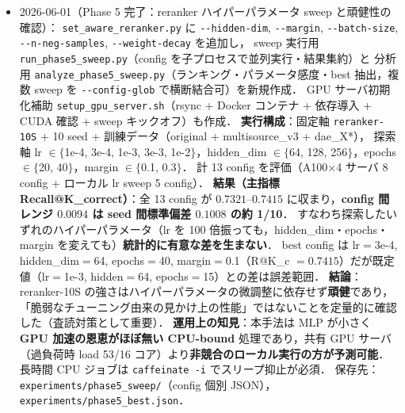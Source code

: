 \documentclass[11pt,a4paper]{jsarticle}
\begin{document}
\begin{itemize}[nosep]
    DAE 難ケースで LLM 直接生成（Claude）を評価．\texttt{generate\_figures\_v6.py} の図B を\textbf{3 者比較}（baseline／LLM／reranker-10S）に更新し，
    \textbf{全難易度で reranker $>$ baseline $>$ LLM}（最難 DAE で LLM $0.264$ に対し本手法 $0.699$，約 2.6 倍）を示した．
    精度向上として Stage1 の retrieval 天井を診断（DAE Recall@50 $=0.86$，高 X で取りこぼし $X{=}10$ で $0.68$）し，
    候補数 top-$k$ を $50\to200$ に拡大して reranker-10S を再評価，\textbf{実用 Recall@20 を $0.912\to0.968$ に改善}した
    （\texttt{topk\_dae\_\{50,100,200\}.json}；厳格 Recall@K\_correct は $+0.02$ で，Stage2 の順位付けが律速と判明）．
    Set-aware 3 特徴量のアブレーション（\texttt{ablation\_setaware.json}）で \textbf{gComp・gCoh が主力，gDom は寄与薄}と判明．
    図 E（シード分散）・F（アブレーション）・G（精度向上）を追加し v6 は 7 ページに．画像内タイトルの図番号は LaTeX キャプション採番へ一本化した．

  \item 2026-06-01（Phase 5 完了：reranker ハイパーパラメータ sweep と頑健性の確認）：
    \texttt{set\_aware\_reranker.py} に \texttt{-{}-hidden-dim}, \texttt{-{}-margin}, \texttt{-{}-batch-size}, \texttt{-{}-n-neg-samples}, \texttt{-{}-weight-decay} を追加し，
    sweep 実行用 \texttt{run\_phase5\_sweep.py}（config を子プロセスで並列実行・結果集約）と
    分析用 \texttt{analyze\_phase5\_sweep.py}（ランキング・パラメータ感度・best 抽出，複数 sweep を \texttt{-{}-config-glob} で横断結合可）を新規作成．
    GPU サーバ初期化補助 \texttt{setup\_gpu\_server.sh}（rsync + Docker コンテナ + 依存導入 + CUDA 確認 + sweep キックオフ）も作成．
    \textbf{実行構成}：固定軸 \texttt{reranker-10S} + 10 seed + 訓練データ（original + multisource\_v3 + dae\_X*），
    探索軸 lr $\in \{$1e-4, 3e-4, 1e-3, 3e-3, 1e-2$\}$，hidden\_dim $\in \{$64, 128, 256$\}$，epochs $\in \{$20, 40$\}$，margin $\in \{$0.1, 0.3$\}$．
    計 13 config を評価（A100$\times$4 サーバ 8 config + ローカル lr sweep 5 config）．
    \textbf{結果（主指標 Recall@K\_correct）}：全 13 config が $0.7321$--$0.7415$ に収まり，\textbf{config 間レンジ $0.0094$ は seed 間標準偏差 $0.1008$ の約 1/10}．
    すなわち探索したいずれのハイパーパラメータ（lr を 100 倍振っても，hidden\_dim・epochs・margin を変えても）\textbf{統計的に有意な差を生まない}．
    best config は lr$=$3e-4, hidden\_dim$=$64, epochs$=$40, margin$=$0.1（R@K\_c $=0.7415$）だが既定値（lr$=$1e-3, hidden$=$64, epochs$=$15）との差は誤差範囲．
    \textbf{結論}：reranker-10S の強さはハイパーパラメータの微調整に依存せず\textbf{頑健}であり，「脆弱なチューニング由来の見かけ上の性能」ではないことを定量的に確認した（査読対策として重要）．
    \textbf{運用上の知見}：本手法は MLP が小さく \textbf{GPU 加速の恩恵がほぼ無い CPU-bound} 処理であり，共有 GPU サーバ（過負荷時 load 53/16 コア）より\textbf{非競合のローカル実行の方が予測可能}．長時間 CPU ジョブは \texttt{caffeinate -i} でスリープ抑止が必須．
    保存先：\texttt{experiments/phase5\_sweep/}（config 個別 JSON），\texttt{experiments/phase5\_best.json}．


\end{itemize}
\end{document}
